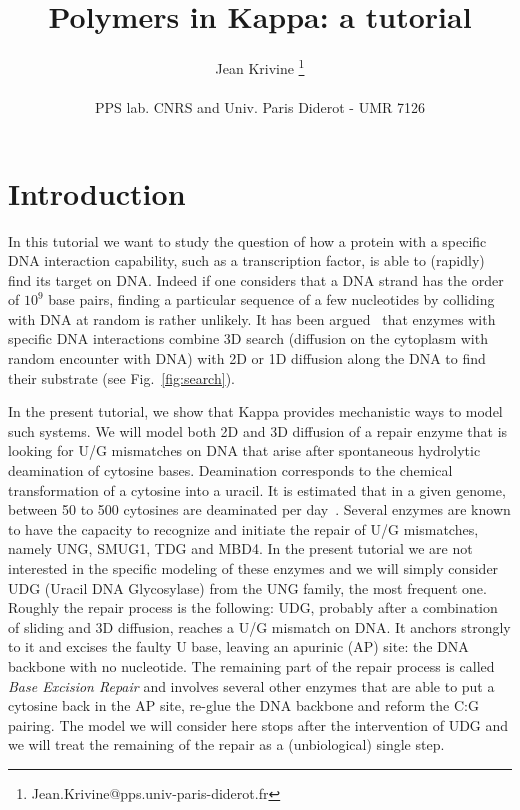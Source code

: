 \documentclass[11pt]{article}
\begin{document}
\title{Polymers in Kappa: a tutorial}
\author{Jean Krivine \thanks{Jean.Krivine@pps.univ-paris-diderot.fr}\\\\ PPS lab. CNRS and Univ. Paris Diderot - UMR 7126}
\date{}
\maketitle
\section{Introduction}
In this tutorial we want to study the question of how a protein with a specific DNA interaction capability, such as a transcription factor, is able to (rapidly) find its target on DNA. Indeed if one considers that a DNA strand has the order of $10^9$ base pairs, finding a particular sequence of a few nucleotides by colliding with DNA at random is rather unlikely. It has been argued~\cite{Dinant_etal09} that enzymes with specific DNA interactions combine 3D search (diffusion on the cytoplasm with random encounter with DNA) with 2D or 1D diffusion along the DNA to find their substrate (see Fig.~\ref{fig:search}). 

In the present tutorial, we show that Kappa provides mechanistic ways to model such systems. We will model both 2D and 3D diffusion of a repair enzyme that is looking for U/G mismatches on DNA that arise after spontaneous hydrolytic deamination of cytosine bases. Deamination corresponds to the chemical transformation of a cytosine into a uracil. It is estimated that in a given genome, between 50 to 500 cytosines are deaminated per day~\cite{Krokan_etal02}. Several enzymes are known to have the capacity to recognize and initiate the repair of U/G mismatches, namely UNG, SMUG1, TDG and MBD4.  In the present tutorial we are not interested in the specific modeling of these enzymes and we will simply consider UDG (Uracil DNA Glycosylase) from the UNG family, the most frequent one. Roughly the repair process is the following: UDG, probably after a combination of sliding and 3D diffusion, reaches a U/G mismatch on DNA. It anchors strongly to it and excises the faulty U base, leaving an apurinic (AP) site: the DNA backbone with no nucleotide. The remaining part of the repair process is called \emph{Base Excision Repair} and involves several other enzymes that are able to put a cytosine back in the AP site, re-glue the DNA backbone and reform the C:G pairing. The model we will consider here stops after the intervention of UDG and we will treat the remaining of the repair as a (unbiological) single step.
\end{document}
